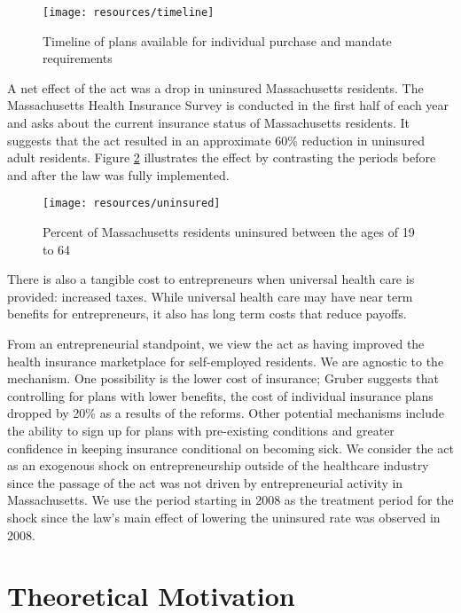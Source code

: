 \documentclass[12pt]{article}
\begin{document}
\begin{figure}[H]
	\centering
	\texttt{[image: resources/timeline]}
	\caption{Timeline of plans available for individual purchase and mandate requirements}
	\label{fig:reformTimeline}
\end{figure}

A net effect of the act was a drop in uninsured Massachusetts residents. The Massachusetts Health Insurance Survey is conducted in the first half of each year and asks about the current insurance status of Massachusetts residents. It suggests that the act resulted in an approximate 60\% reduction in uninsured adult residents. Figure \ref{fig:uninsuredRate} illustrates the effect by contrasting the periods before and after the law was fully implemented. 

\begin{figure}[H]
	\centering
	\texttt{[image: resources/uninsured]}
	\caption{Percent of Massachusetts residents uninsured between the ages of 19 to 64}
	\label{fig:uninsuredRate}
\end{figure}

There is also a tangible cost to entrepreneurs when universal health care is provided: increased taxes.  While universal health care may have near term benefits for entrepreneurs, it also has long term costs that reduce payoffs. 

From an entrepreneurial standpoint, we view the act as having improved the health insurance marketplace for self-employed residents. We are agnostic to the mechanism. One possibility is the lower cost of insurance; Gruber \cite{gruber} suggests that controlling for plans with lower benefits, the cost of individual insurance plans dropped by 20\% as a results of the reforms. Other potential mechanisms include the ability to sign up for plans with pre-existing conditions and greater confidence in keeping insurance conditional on becoming sick. We consider the act as an exogenous shock on entrepreneurship outside of the healthcare industry since the passage of the act was not driven by entrepreneurial activity in Massachusetts. We use the period starting in 2008 as the treatment period for the shock since the law's main effect of lowering the uninsured rate was observed in 2008. 

\section{Theoretical Motivation}
\label{sec:model}
\end{document}
